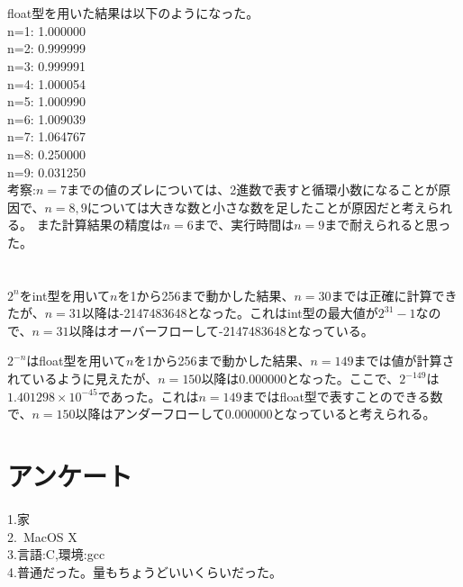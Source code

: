 \documentclass[11pt,a4paper]{jsarticle}
\begin{document}
\section{}
\noindent
float型を用いた結果は以下のようになった。\\
n=1: 1.000000 \\
n=2: 0.999999 \\
n=3: 0.999991 \\
n=4: 1.000054 \\
n=5: 1.000990 \\
n=6: 1.009039 \\
n=7: 1.064767 \\
n=8: 0.250000 \\
n=9: 0.031250 \\
考察:$n=7$までの値のズレについては、2進数で表すと循環小数になることが原因で、$n=8,9$については大きな数と小さな数を足したことが原因だと考えられる。
また計算結果の精度は$n=6$まで、実行時間は$n=9$まで耐えられると思った。

\section{}
$2^n$をint型を用いて$n$を1から256まで動かした結果、$n=30$までは正確に計算できたが、$n=31$以降は-2147483648となった。これはint型の最大値が$2^31-1$なので、$n=31$以降はオーバーフローして-2147483648となっている。

$2^{-n}$はfloat型を用いて$n$を1から256まで動かした結果、$n=149$までは値が計算されているように見えたが、$n=150$以降は0.000000となった。ここで、$2^{-149}$は$1.401298 \times 10^{-45}$であった。これは$n=149$まではfloat型で表すことのできる数で、$n=150$以降はアンダーフローして0.000000となっていると考えられる。

\section*{アンケート}
\noindent
1.家 \\
2.\ MacOS X \\
3.言語:C,環境:gcc \\
4.普通だった。量もちょうどいいくらいだった。

\newpage
\end{document}
